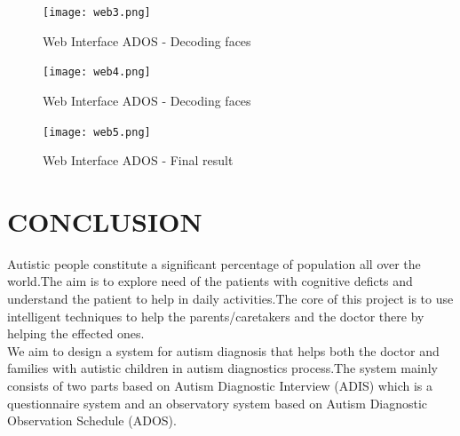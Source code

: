 \begin{figure}[h]
\label{ss}
\centering
\texttt{[image: web3.png]}
\caption{Web Interface ADOS - Decoding faces}
\end{figure}
\begin{figure}[h]
\label{ss}
\centering
\texttt{[image: web4.png]}
\caption{Web Interface ADOS - Decoding faces}
\end{figure}
\begin{figure}[h]
\label{ss}
\centering
\texttt{[image: web5.png]}
\caption{Web Interface ADOS - Final result}
\end{figure}







\chapter{CONCLUSION}

Autistic people constitute a significant percentage of population all over the world.The aim is to explore need of the patients with cognitive deficts and understand the patient to help in daily activities.The core of this project is to use intelligent techniques to help the parents/caretakers and the doctor there by helping the effected ones.
\\ We aim to design a system for autism diagnosis that helps both the doctor and families with autistic children in autism diagnostics process.The  system mainly consists of two parts based on Autism Diagnostic Interview (ADIS) which is a questionnaire system and an observatory system based on Autism Diagnostic Observation Schedule (ADOS).
\clearpage
%



